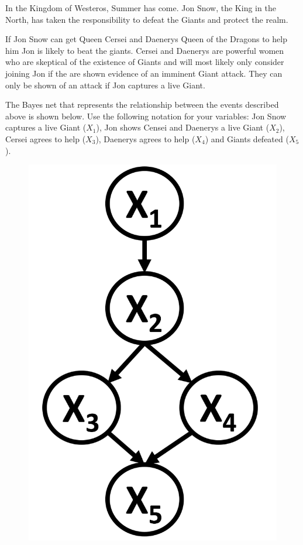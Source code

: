 \documentclass[11pt,addpoints,answers]{exam}
\begin{document}
In the Kingdom of Westeros, Summer has come. Jon Snow, the King in the North, has taken the responsibility to defeat the Giants and protect the realm.

If Jon Snow can get Queen Cersei and Daenerys Queen of the Dragons to help him Jon is likely to beat the giants. Cersei and Daenerys are powerful women who are skeptical of the existence of Giants and will most likely only consider joining Jon if the are shown evidence of an imminent Giant attack. They can only be shown of an attack if Jon captures a live Giant.

The Bayes net that represents the relationship between the events described above is shown below. Use the following notation for your variables: Jon Snow captures a live Giant ($X_1$), Jon shows Censei and Daenerys a live Giant  ($X_2$), Cersei agrees to help ($X_3$), Daenerys agrees to help ($X_4$) and Giants defeated ($X_5$).
\begin{figure}[!hbtp]
\centering
\includegraphics[scale=0.3]{images/q2.png}
\end{figure}
\end{document}
